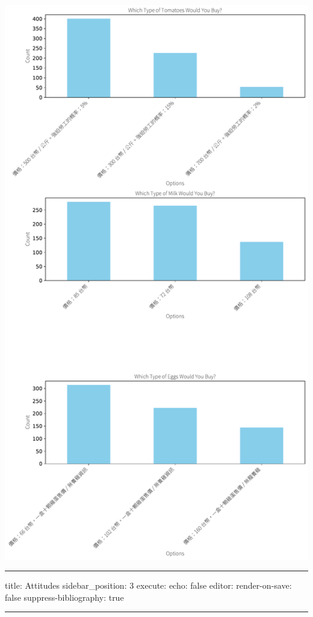 \documentclass[
  letterpaper,
  DIV=11,
  numbers=noendperiod]{scrartcl}
\begin{document}
\includegraphics{_thesis_files/figure-pdf/cell-9-output-1.pdf}

\begin{center}\rule{0.5\linewidth}{0.5pt}\end{center}

title: Attitudes sidebar\_position: 3 execute: echo: false editor:
render-on-save: false suppress-bibliography: true

\begin{center}\rule{0.5\linewidth}{0.5pt}\end{center}
\end{document}
